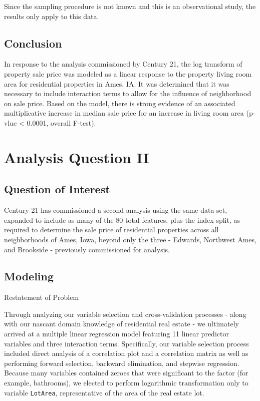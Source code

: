 \documentclass[american,]{article}
\theoremstyle{definition}
\theoremstyle{definition}
\theoremstyle{definition}
\theoremstyle{remark}
\begin{document}
Since the sampling procedure is not known and this is an observational
study, the results only apply to this data.

\hypertarget{conclusion}{%
\subsection{Conclusion}\label{conclusion}}

In response to the analysis commissioned by Century 21, the log
transform of property sale price was modeled as a linear response to the
property living room area for residential properties in Ames, IA. It was
determined that it was necessary to include interaction terms to allow
for the influence of neighborhood on sale price. Based on the model,
there is strong evidence of an associated multiplicative increase in
median sale price for an increase in living room area (p-vlue
\textless{} 0.0001, overall F-test).

\hypertarget{analysis-question-ii}{%
\section{Analysis Question II}\label{analysis-question-ii}}

\hypertarget{question-of-interest-1}{%
\subsection{Question of Interest}\label{question-of-interest-1}}

Century 21 has commissioned a second analysis using the same data set,
expanded to include as many of the 80 total features, plus the index
split, as required to determine the sale price of residential properties
across all neighborhoods of Ames, Iowa, beyond only the three - Edwards,
Northwest Ames, and Brookside - previously commissioned for analysis.

\hypertarget{modeling-1}{%
\subsection{Modeling}\label{modeling-1}}

Restatement of Problem

Through analyzing our variable selection and cross-validation processes
- along with our nascant domain knowledge of residential real estate -
we ultimately arrived at a multiple linear regression model featuring 11
linear predictor variables and three interaction terms. Specifically,
our variable selection process included direct analysis of a correlation
plot and a correlation matrix as well as performing forward selection,
backward elimination, and stepwise regression. Because many variables
contained zeroes that were significant to the factor (for example,
bathrooms), we elected to perform logarithmic transformation only to
variable \texttt{LotArea}, representative of the area of the real estate
lot.
\end{document}

